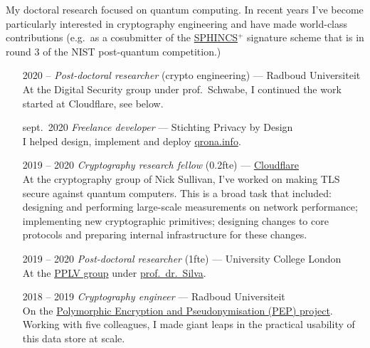 \documentclass[a4page]{article}
\newcommand\partitle[1]{\vskip20pt\par\noindent{\textsf{\textbf{#1}}}}
\begin{document}
My doctoral research focused on quantum computing.
In recent years I've become particularly interested
    in cryptography engineering and have made world-class contributions
        (e.g.~as a cosubmitter of the
	\href{https://sphincs.org/data/sphincs+-round3-specification.pdf}{SPHINCS$^+$}
    signature scheme that is in round 3 of the NIST post-quantum competition.)

\partitle{Career}
\begin{itemize}
    \item[2020 --] \emph{Post-doctoral researcher} (crypto engineering) --- Radboud Universiteit\\
        At the Digital Security group under prof.~Schwabe,
            I continued the work started at Cloudflare, see below.
    \item[sept.~2020] \emph{Freelance developer} --- Stichting Privacy by Design\\
        I helped design, implement and deploy \href{https://qrona.info}{qrona.info}.
    \item[2019 -- 2020] \emph{Cryptography research fellow} (0.2fte) --- 
        \href{https://cloudflare.com}{Cloudflare} \\
        At the cryptography group of Nick Sullivan, I've
            worked on making TLS secure against quantum computers.
        This is a broad task that included:
                designing and performing large-scale measurements on network
                    performance;
                implementing new cryptographic primitives;
                designing changes to core protocols and
                    preparing internal infrastructure for these changes.
    \item[2019 -- 2020] \emph{Post-doctoral researcher} (1fte) --- University
        College London\\
        At the \href{http://pplv.cs.ucl.ac.uk/welcome/}{PPLV group}
            under \href{https://alexandrasilva.org/#/main.html}{prof.~dr.~Silva}.
    \item[2018 -- 2019] \emph{Cryptography engineer} --- Radboud Universiteit\\
        On the \href{https://pep.cs.ru.nl}{Polymorphic Encryption and Pseudonymisation (PEP) project}.
        Working with five colleagues, I made giant leaps in the practical usability
        of this data store at scale.


\end{itemize}
\end{document}
